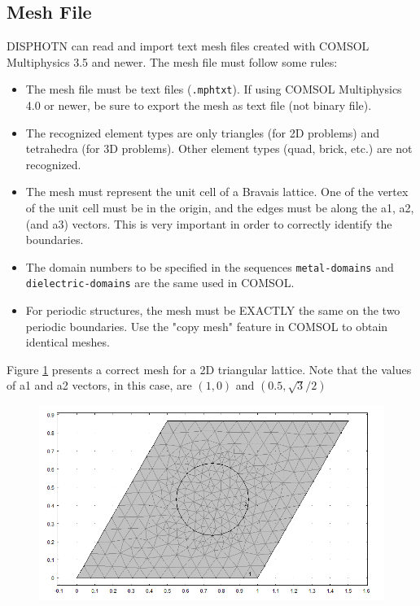 \documentclass[11pt,a4paper,oneside]{article}
\begin{document}
\subsection{Mesh File}
DISPHOTN can read and import text mesh files created with COMSOL Multiphysics 3.5 and newer. The mesh file must follow some rules:
\begin{itemize}
\item The mesh file must be text files ({\tt .mphtxt}). If using COMSOL Multiphysics 4.0 or newer, be sure to export the mesh as text file (not binary file).
\item The recognized element types are only triangles (for 2D problems) and tetrahedra (for 3D problems). Other element types (quad, brick, etc.) are not recognized.
\item The mesh must represent the unit cell of a Bravais lattice. One of the vertex of the unit cell must be in the origin, and the edges must be along the a1, a2, (and a3) vectors. This is very important in order to correctly identify the boundaries.
\item The domain numbers to be specified in the sequences {\tt metal-domains} and {\tt dielectric-domains} are the same used in COMSOL.
\item For periodic structures, the mesh must be EXACTLY the same on the two periodic boundaries. Use the "copy mesh" feature in COMSOL to obtain identical meshes.
\end{itemize}
Figure \ref{fig:2dmesh} presents a correct mesh for a 2D triangular lattice. Note that the values of a1 and a2 vectors, in this case, are $(1, 0)$ and $(0.5, \sqrt{3}/2)$
\begin{figure}[h]
\includegraphics[width=\textwidth]{2dmesh}
\caption{\label{fig:2dmesh}}
\end{figure}
\end{document}
